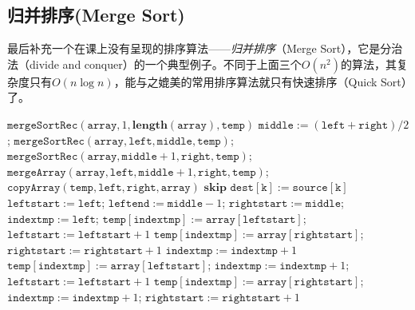 \documentclass[b5paper,oneside]{ctexbook}
\newcommand{\kw}[1]{\mathbf{#1}}
\begin{document}
\subsection{归并排序(Merge Sort)}
最后补充一个在课上没有呈现的排序算法——\textit{归并排序}（Merge Sort），它是分治法（divide and conquer）的一个典型例子。不同于上面三个$O(n^2)$的算法，其复杂度只有$O(n\log n)$，能与之媲美的常用排序算法就只有快速排序（Quick Sort）了。
\begin{algorithmic}
  \State $\mathtt{mergeSortRec}(\mathtt{array}, 1, \kw{length}(\mathtt
{array}), \mathtt{temp})$
  \EndB
				\State $\mathtt{middle} := (\mathtt{left} + \mathtt{right}) / 
2$;
				\State $\mathtt{mergeSortRec}(\mathtt{array}, \mathtt{left}, 
\mathtt{middle}, \mathtt{temp})$;
				\State $\mathtt{mergeSortRec}(\mathtt{array}, \mathtt{middle} + 
1, \mathtt{right}, \mathtt{temp})$;
				\State $\mathtt{mergeArray}(\mathtt{array}, \mathtt{left}, 
\mathtt{middle} + 1, \mathtt{right}, \mathtt{temp})$;
				\State $\mathtt{copyArray}(\mathtt{temp}, \mathtt{left}, 
\mathtt{right}, \mathtt{array})$
			\Else
				\State $\kw{skip}$
			\Fi
		\EndB
				\State $\mathtt{dest}[\mathtt{k}] := \mathtt{source}[\mathtt
{k}]$
			\ForDone
	\EndB
			\State $\mathtt{leftstart} := \mathtt{left}$;
			\State $\mathtt{leftend} := \mathtt{middle} - 1$;
			\State $\mathtt{rightstart} := \mathtt{middle}$;
			\State $\mathtt{indextmp} := \mathtt{left}$;
					\State $\mathtt{temp}[\mathtt{indextmp}] := \mathtt
{array}[\mathtt{leftstart}]$;
					\State $\mathtt{leftstart} := \mathtt{leftstart} + 1$
				\Else
					\State $\mathtt{temp}[\mathtt{indextmp}] := \mathtt
{array}[\mathtt{rightstart}]$;
					\State $\mathtt{rightstart} := \mathtt{rightstart} + 1$
				\Fi
				\State $\mathtt{indextmp} := \mathtt{indextmp} + 1$
			\WhileDone
				\State $\mathtt{temp}[\mathtt{indextmp}] := \mathtt{array}
[\mathtt{leftstart}]$;
				\State $\mathtt{indextmp} := \mathtt{indextmp} + 1$;
				\State $\mathtt{leftstart} := \mathtt{leftstart} + 1$
			\WhileDone
				\State $\mathtt{temp}[\mathtt{indextmp}] := \mathtt{array}
[\mathtt{rightstart}]$;
				\State $\mathtt{indextmp} := \mathtt{indextmp} + 1$;
				\State $\mathtt{rightstart} := \mathtt{rightstart} + 1$
			\WhileDone
		\EndB
\end{algorithmic}
\end{document}
